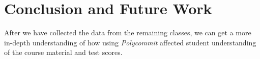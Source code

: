 \section{Conclusion and Future Work}

\par After we have collected the data from the remaining classes, we can get a more in-depth understanding of how using \textit{Polycommit} affected student understanding of the course material and test scores.